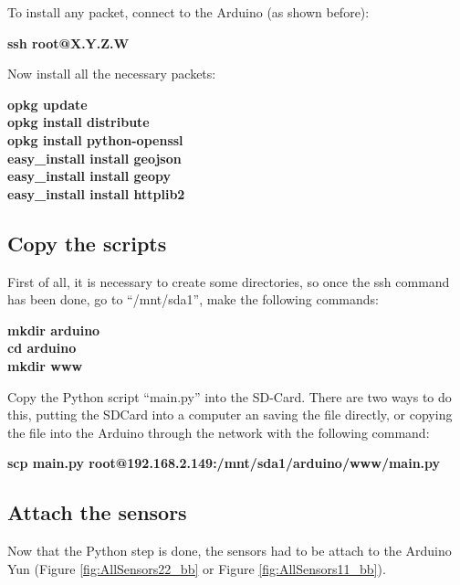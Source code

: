\documentclass[12pt, a4paper,twoside]{tesi_upf}
\begin{document}
    To install any packet, connect to the Arduino (as shown before):
    
    {\begin{centering} \textbf{ssh root@X.Y.Z.W}\par \end{centering}}
    
    Now install all the necessary packets:
     
      {\begin{centering} \textbf{
          opkg update \\
          opkg install distribute \\
          opkg install python-openssl \\
          easy\_install install geojson \\
          easy\_install install geopy \\
          easy\_install install httplib2
        }
      \par \end{centering}}
    
  \subsection{Copy the scripts}
    First of all, it is necessary to create some directories, so once the ssh command has been done, go to ``/mnt/sda1'', make the following commands:
    
    {\begin{centering} \textbf{
    mkdir arduino \\
    cd arduino \\
    mkdir www \\
    }\par \end{centering}}
    
    Copy the Python script ``main.py'' into the SD-Card. There are two ways to do this, putting the SDCard into a computer an saving the file directly, or copying the file into the Arduino through the network with the following command:
    
    {\begin{centering} \textbf{
    scp main.py root@192.168.2.149:/mnt/sda1/arduino/www/main.py
    }\par \end{centering}}
  
  \subsection{Attach the sensors}
    Now that the Python step is done, the sensors had to be attach to the Arduino Yun (Figure \ref{fig:AllSensors22_bb} or Figure \ref{fig:AllSensors11_bb}).
  
\end{document}
